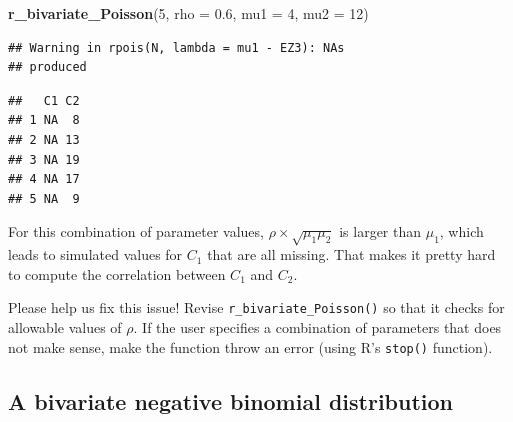 \documentclass[
]{book}
\newenvironment{Shaded}{\begin{snugshade}}{\end{snugshade}}
\newcommand{\AttributeTok}[1]{\textcolor[rgb]{0.13,0.29,0.53}{#1}}
\newcommand{\DecValTok}[1]{\textcolor[rgb]{0.00,0.00,0.81}{#1}}
\newcommand{\FloatTok}[1]{\textcolor[rgb]{0.00,0.00,0.81}{#1}}
\newcommand{\FunctionTok}[1]{\textcolor[rgb]{0.13,0.29,0.53}{\textbf{#1}}}
\newcommand{\NormalTok}[1]{#1}
\begin{document}
\begin{Shaded}
\begin{Highlighting}[]
\FunctionTok{r\_bivariate\_Poisson}\NormalTok{(}\DecValTok{5}\NormalTok{, }\AttributeTok{rho =} \FloatTok{0.6}\NormalTok{, }\AttributeTok{mu1 =} \DecValTok{4}\NormalTok{, }\AttributeTok{mu2 =} \DecValTok{12}\NormalTok{)}
\end{Highlighting}
\end{Shaded}

\begin{verbatim}
## Warning in rpois(N, lambda = mu1 - EZ3): NAs
## produced
\end{verbatim}

\begin{verbatim}
##   C1 C2
## 1 NA  8
## 2 NA 13
## 3 NA 19
## 4 NA 17
## 5 NA  9
\end{verbatim}

For this combination of parameter values, \(\rho \times \sqrt{\mu_1 \mu_2}\) is larger than \(\mu_1\), which leads to simulated values for \(C_1\) that are all missing.
That makes it pretty hard to compute the correlation between \(C_1\) and \(C_2\).

Please help us fix this issue! Revise \texttt{r\_bivariate\_Poisson()} so that it checks for allowable values of \(\rho\). If the user specifies a combination of parameters that does not make sense, make the function throw an error (using R's \texttt{stop()} function).

\subsection{A bivariate negative binomial distribution}\label{BVNB1}
\end{document}
